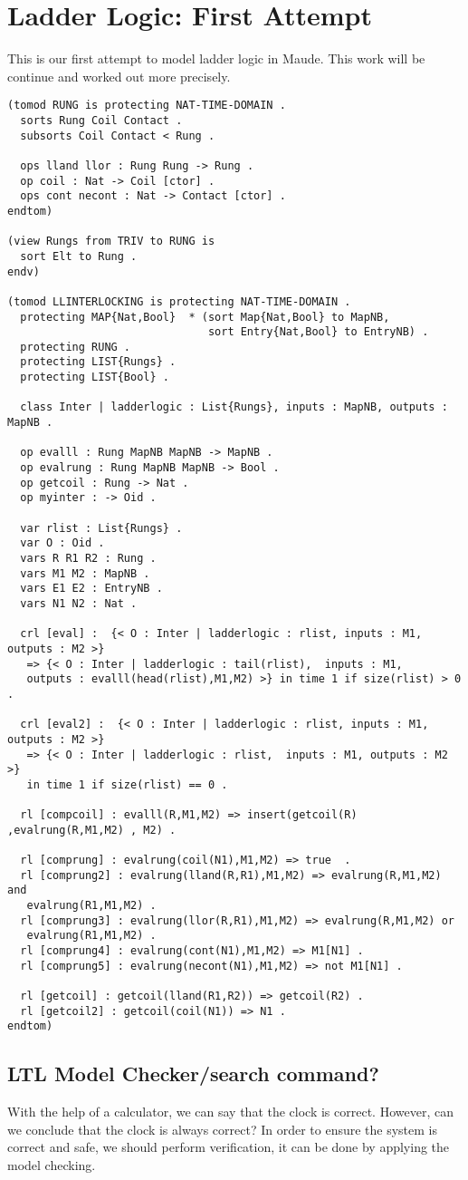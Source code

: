 \documentclass[a4paper,11pt]{report}
\begin{document}
\chapter{Ladder Logic: First Attempt}
This is our first attempt to model ladder logic in Maude. This work will be continue and worked out more precisely.
\begin{verbatim}
(tomod RUNG is protecting NAT-TIME-DOMAIN .
  sorts Rung Coil Contact .
  subsorts Coil Contact < Rung .

  ops lland llor : Rung Rung -> Rung .
  op coil : Nat -> Coil [ctor] .
  ops cont necont : Nat -> Contact [ctor] .
endtom)

(view Rungs from TRIV to RUNG is
  sort Elt to Rung .
endv)

(tomod LLINTERLOCKING is protecting NAT-TIME-DOMAIN . 
  protecting MAP{Nat,Bool}  * (sort Map{Nat,Bool} to MapNB,
                               sort Entry{Nat,Bool} to EntryNB) .
  protecting RUNG .
  protecting LIST{Rungs} .
  protecting LIST{Bool} .

  class Inter | ladderlogic : List{Rungs}, inputs : MapNB, outputs : MapNB .
  
  op evalll : Rung MapNB MapNB -> MapNB .
  op evalrung : Rung MapNB MapNB -> Bool .
  op getcoil : Rung -> Nat .  
  op myinter : -> Oid .

  var rlist : List{Rungs} .
  var O : Oid .
  vars R R1 R2 : Rung .
  vars M1 M2 : MapNB .
  vars E1 E2 : EntryNB .
  vars N1 N2 : Nat .

  crl [eval] :  {< O : Inter | ladderlogic : rlist, inputs : M1, outputs : M2 >} 
   => {< O : Inter | ladderlogic : tail(rlist),  inputs : M1, 
   outputs : evalll(head(rlist),M1,M2) >} in time 1 if size(rlist) > 0 .

  crl [eval2] :  {< O : Inter | ladderlogic : rlist, inputs : M1, outputs : M2 >} 
   => {< O : Inter | ladderlogic : rlist,  inputs : M1, outputs : M2 >} 
   in time 1 if size(rlist) == 0 .  
  
  rl [compcoil] : evalll(R,M1,M2) => insert(getcoil(R) ,evalrung(R,M1,M2) , M2) .

  rl [comprung] : evalrung(coil(N1),M1,M2) => true  .
  rl [comprung2] : evalrung(lland(R,R1),M1,M2) => evalrung(R,M1,M2) and 
   evalrung(R1,M1,M2) .
  rl [comprung3] : evalrung(llor(R,R1),M1,M2) => evalrung(R,M1,M2) or 
   evalrung(R1,M1,M2) .
  rl [comprung4] : evalrung(cont(N1),M1,M2) => M1[N1] .
  rl [comprung5] : evalrung(necont(N1),M1,M2) => not M1[N1] .

  rl [getcoil] : getcoil(lland(R1,R2)) => getcoil(R2) .
  rl [getcoil2] : getcoil(coil(N1)) => N1 . 
endtom)
\end{verbatim}
\iffalse \section{LTL Model Checker/search command?}
With the help of a calculator, we can say that the clock is correct. However, can we conclude that the clock is always correct? In order to ensure the system is correct and safe, we should perform verification, it can be done by applying the model checking. 
\end{document}
